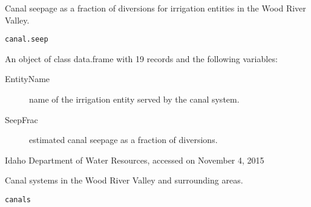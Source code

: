 \documentclass[a4paper]{book}
\begin{document}
%
\begin{Description}\relax
Canal seepage as a fraction of diversions for irrigation entities in the Wood River Valley.
\end{Description}
%
\begin{Usage}
\begin{verbatim}
canal.seep
\end{verbatim}
\end{Usage}
%
\begin{Format}
An object of class data.frame with 19 records and the following variables:
\begin{description}

\item[EntityName] name of the irrigation entity served by the canal system.
\item[SeepFrac] estimated canal seepage as a fraction of diversions.

\end{description}
\end{Format}
%
\begin{Source}\relax
Idaho Department of Water Resources, accessed on November 4, 2015
\end{Source}
%
\begin{SeeAlso}\relax
{}
\end{SeeAlso}
%
\begin{Examples}
\end{Examples}
%
\begin{Description}\relax
Canal systems in the Wood River Valley and surrounding areas.
\end{Description}
%
\begin{Usage}
\begin{verbatim}
canals
\end{verbatim}
\end{Usage}
\end{document}
